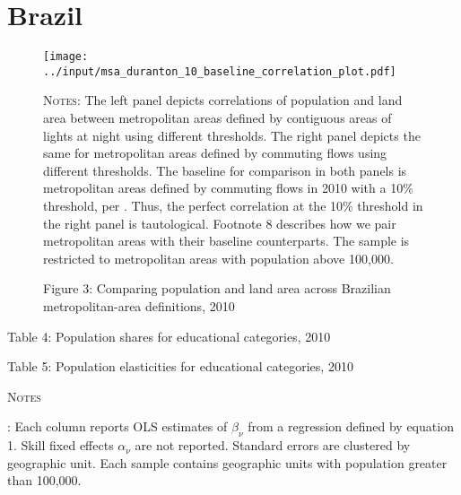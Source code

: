 \documentclass[11pt]{article}
\begin{document}
\section{Brazil}

\begin{figure}
\caption*{Figure 3: Comparing population and land area across Brazilian metropolitan-area
definitions, 2010\label{fig:Brazil-correlations-metro-definitions}}
\begin{center}
\texttt{[image: ../input/msa\_duranton\_10\_baseline\_correlation\_plot.pdf]}
\begin{minipage}{0.8\textwidth}
{\footnotesize
	\textsc{Notes}:
	The left panel depicts correlations of population and land area between metropolitan areas defined by contiguous areas of lights at night using different thresholds.
	The right panel depicts the same for metropolitan areas defined by commuting flows using different thresholds.
	The baseline for comparison in both panels is metropolitan areas defined by commuting flows in 2010 with a 10\% threshold, per \cite{Duranton:2015}.
	Thus, the perfect correlation at the 10\% threshold in the right panel is tautological.
	Footnote 8 describes how we pair metropolitan areas with their baseline counterparts.
	The sample is restricted to metropolitan areas with population above 100,000.\par
}
\end{minipage}
\end{center}

\end{figure}


\begin{table} \caption*{Table 4: Population shares for educational categories, 2010} \begin{center}

\end{center}\end{table}


\begin{table}[pth]
\caption*{Table 5: Population elasticities for educational categories, 2010\label{tab:Brazil-edu-Population-elasticities}}
\begin{centering}
\resizebox{\textwidth}{!}{}
\par\end{centering}
\centering{}%
\begin{minipage}[t]{0.95\textwidth}%
\textsc{\footnotesize{}Notes}{\footnotesize{}:
Each column reports OLS estimates of $\beta_{\nu}$ from a regression defined by equation 1.
Skill fixed effects $\alpha_{\nu}$ are not reported.
Standard errors are clustered by geographic unit.
Each sample contains geographic units with population greater than 100,000.\par}
\end{minipage}
\end{table}
\end{document}
